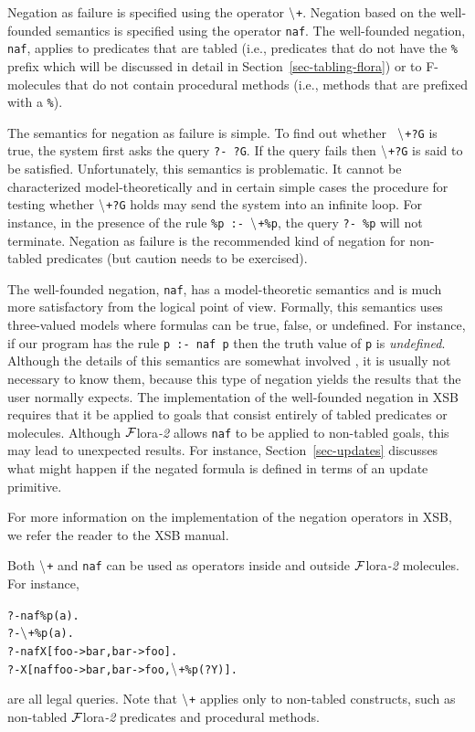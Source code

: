 \documentclass[11pt]{article}
\newcommand{\FLORA}{{\mbox{\sc ${\cal F}${lora}\rm\emph{-2}}}\xspace}
\newcommand{\PLGNAF}{\mbox{\tt \ensuremath{\tt\backslash}+}\xspace}
\newcommand{\SILKNAF}{{{\tt naf}}\xspace}
\begin{document}
Negation as failure is specified using the operator \PLGNAF.
Negation based on the well-founded semantics is specified using the
operator \SILKNAF.  The well-founded negation, \SILKNAF, applies to predicates
that are tabled (i.e., predicates that do not have the {\tt \%} prefix
which will be discussed in detail in Section~\ref{sec-tabling-flora}) or
to F-molecules that do not contain procedural methods (i.e., methods that
are prefixed with a {\tt \%}).

The semantics for negation as failure is simple. To find out whether {\tt
  \PLGNAF ?G} is true, the system first asks the query {\tt ?- ?G}. If the query
fails then {\tt \PLGNAF ?G} is said to be satisfied. Unfortunately, this
semantics is problematic. It cannot be characterized model-theoretically
and in certain simple cases the procedure for testing whether {\tt \PLGNAF ?G}
holds may send the system into an infinite loop. For instance, in the
presence of the rule {\tt \%p :- \PLGNAF \%p}, the query {\tt ?- \%p} will not
terminate.  Negation as failure is the recommended kind of negation for
non-tabled predicates (but caution needs to be exercised).

The well-founded negation, \SILKNAF, has a model-theoretic semantics and is
much more
satisfactory from the logical point of view.
Formally, this semantics uses three-valued models where formulas can be
true, false, or undefined. For instance, if our program has the rule
{\tt p :- \SILKNAF p} then the truth value of {\tt p} is \emph{undefined}.  
Although the details of this
semantics are somewhat involved \cite{gelder-ross-schlipf-91}, it is
usually not necessary to know them, because this type of negation yields
the results that the user normally expects. The implementation of
the well-founded negation in XSB requires that it be applied to goals that
consist entirely of tabled predicates or molecules.
Although \FLORA allows \SILKNAF to be applied to non-tabled goals,
this may lead to unexpected results.  For instance, 
Section~\ref{sec-updates} discusses what might happen if the
negated formula is defined in terms of an update primitive.

For more information on the implementation of the negation operators in
XSB, we refer the reader to the XSB manual.

Both \PLGNAF and \SILKNAF can be used as operators inside and outside \FLORA
molecules. For instance,
\begin{alltt}
       ?- \SILKNAF \%p(a).
       ?- \PLGNAF \%p(a).
       ?- \SILKNAF X[foo->bar, bar->foo].
       ?- X[\SILKNAF foo->bar, bar->foo, \PLGNAF \%p(?Y)].
\end{alltt}
are all legal queries. Note that \PLGNAF applies only to non-tabled
constructs, such as non-tabled \FLORA predicates and procedural methods.
\end{document}

